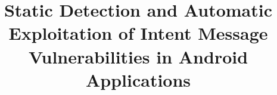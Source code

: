 \documentclass[conference]{IEEEtran}
\newcommand{\titlea}{Static Detection and Automatic Exploitation of Intent Message Vulnerabilities in Android Applications}
\begin{document}
\title{\titlea}



\end{document}
